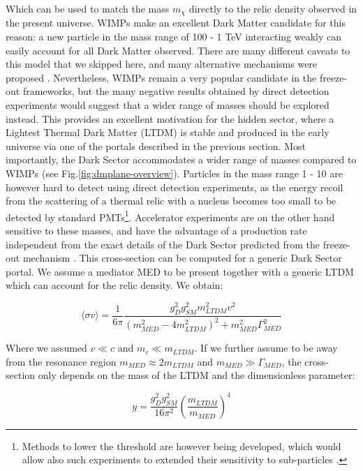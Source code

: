   Which can be used to match the mass $m_{\chi}$ directly to the relic density observed in the present universe. WIMPs make an excellent Dark Matter candidate for this reason: a new particle in the mass range of 100 \gev - 1 \si{\tera\electronvolt} interacting weakly can easily account for all Dark Matter observed. There are many different caveats to this model that we skipped here, and many alternative mechanisms were proposed \cite{Hall:2009bx,Feng:2010gw,Marsh:2015xka,Griest:1990kh,Arcadi:2017kky}. Nevertheless, WIMPs remain a very popular candidate in the freeze-out frameworks, but the many negative results obtained by direct detection experiments would suggest that a wider range of masses should be explored instead. This provides an excellent motivation for the hidden sector, where a Lightest Thermal Dark Matter (LTDM) is stable and produced in the early universe via one of the portals described in the previous section. Most importantly, the Dark Sector accommodates a wider range of masses compared to WIMPs (see Fig.\ref{fig:dmplane-overview}). Particles in the mass range 1 \mev - 10 \gev are however hard to detect using direct detection experiments, as the energy recoil from the scattering of a thermal relic with a nucleus becomes too small to be detected by standard PMTs\footnote{Methods to lower the threshold are however being developed, which would allow also such experiments to extended their sensitivity to sub-\gev particles \cite{Baracchini:2020nut}.}. Accelerator experiments are on the other hand sensitive to these masses, and have the advantage of a production rate independent from the exact details of the Dark Sector predicted from the freeze-out mechanism \cite{battaglieri2017cosmic}. This cross-section can be computed for a generic Dark Sector portal. We assume a mediator MED to be present together with a generic LTDM which can account for the relic density. We obtain:

  \begin{equation}
    \label{eq:dm-cs-fo}
    \langle \sigma v \rangle = \frac{1}{6\pi}\frac{g^2_D g^2_{SM} m^2_{LTDM} v^2}{(m^2_{MED} - 4m^2_{LTDM})^2 + m^2_{MED}\Gamma^2_{MED}}
    \end{equation}

    
    Where we assumed $v \ll c$ and $m_e \ll m_{LTDM}$. If we further assume to be away from the resonance region $m_{MED} \approx 2m_{LTDM}$ and $m_{MED} \gg \Gamma_{MED}$, the cross-section only depends on the mass of the LTDM and the dimensionless parameter:

    \begin{equation}
      \label{eq:dmplane-y}
      y = \frac{g^2_D g^2_{SM}}{16 \pi^2} \left( \frac{m_{LTDM}}{m_{MED}} \right)^4
    \end{equation}

